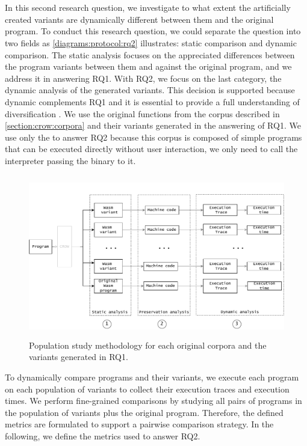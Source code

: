 
\section{\rqtwo}
\label{rq2:method}


In this second research question, we investigate to what extent the artificially created variants are dynamically different between them and the original program. To conduct this research question, we could separate the question into two fields as \autoref{diagrams:protocol:rq2} illustrates: static comparison and dynamic comparison. 
The static analysis focuses on the appreciated differences between the program variants between them and against the original program, and we address it in answering RQ1. 
With RQ2, we focus on the last category, the dynamic analysis of the generated variants. This decision is supported because dynamic complements RQ1 and it is essential to provide a full understanding of diversification \citationneeded.
We use the original functions from the \corpusrosetta corpus described in \autoref{section:crow:corpora} and their variants generated in the answering of RQ1. 
We use only the \corpusrosetta to answer RQ2 because this corpus is composed of simple programs that can be executed directly without user interaction, \ie we only need to call the interpreter passing the \wasm binary to it. 


\begin{figure}[h]
    \centering
    \includegraphics[height=2.8in]{diagrams/Rq2.pdf}
    \caption{Population study methodology for each original corpora and the variants generated in RQ1.}
    \label{diagrams:protocol:rq2}
\end{figure}

To dynamically compare programs and their variants, we execute each program on each population of variants to collect their execution traces and execution times. We perform fine-grained comparisons by studying all pairs of programs in the population of variants plus the original program. Therefore, the defined metrics are formulated to support a pairwise comparison strategy.
In the following, we define the metrics used to answer RQ2.

